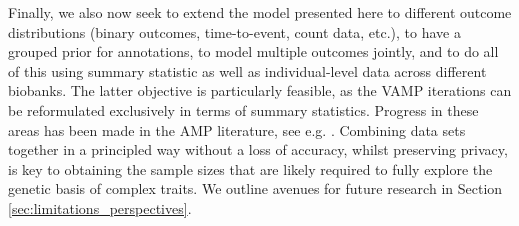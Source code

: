 Finally, we also now seek to extend the model presented here to different outcome distributions (binary outcomes, time-to-event, count data, etc.), to have a grouped prior for annotations, to model multiple outcomes jointly, and to do all of this using summary statistic as well as individual-level data across different biobanks. The latter objective is particularly feasible, as the VAMP iterations can be reformulated exclusively in terms of summary statistics. Progress in these areas has been made in the AMP literature, see e.g. \cite{schniter_vector_2016,Fletcher2019}. Combining data sets together in a principled way without a loss of accuracy, whilst preserving privacy, is key to obtaining the sample sizes that are likely required to fully explore the genetic basis of complex traits. We outline avenues for future research in Section \ref{sec:limitations_perspectives}.

